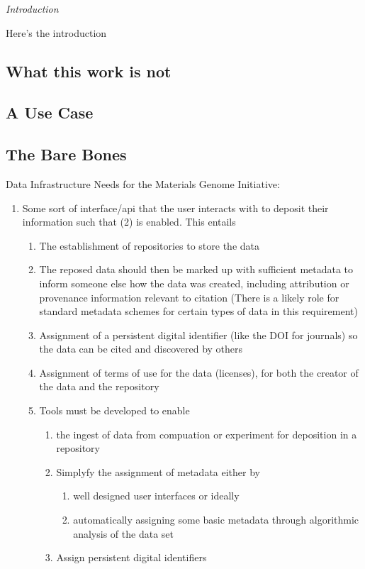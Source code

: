 \textit{Introduction}

Here's the introduction

\subsection{What this work is not}

\subsection{A Use Case}

\subsection{The Bare Bones}
Data Infrastructure Needs for the Materials Genome Initiative:
\begin{enumerate}
\item Some sort of interface/api that the user interacts with to deposit their information such that (2) is enabled.  This entails
\begin{enumerate}
\item The establishment of repositories to store the data
\item The reposed data should then be marked up with sufficient metadata to inform someone else how the data was created, including attribution or provenance information relevant to citation 
(There is a likely role for standard metadata schemes for certain types of data in this requirement)
\item	Assignment of a persistent digital identifier (like the DOI for journals) so the data can be cited and discovered by others
\item Assignment of terms of use for the data (licenses), for both the
  creator of the data and the repository
\item Tools must be developed to enable 
\begin{enumerate}
\item the ingest of data from compuation or experiment for deposition
  in a repository
\item  Simplyfy the assignment of metadata either by
\begin{enumerate}
\item  well designed user interfaces or ideally 
\item automatically assigning some basic metadata through algorithmic
  analysis of the data set
\end{enumerate}
\item 	Assign persistent digital identifiers

\end{enumerate}
\end{enumerate}
\end{enumerate}
